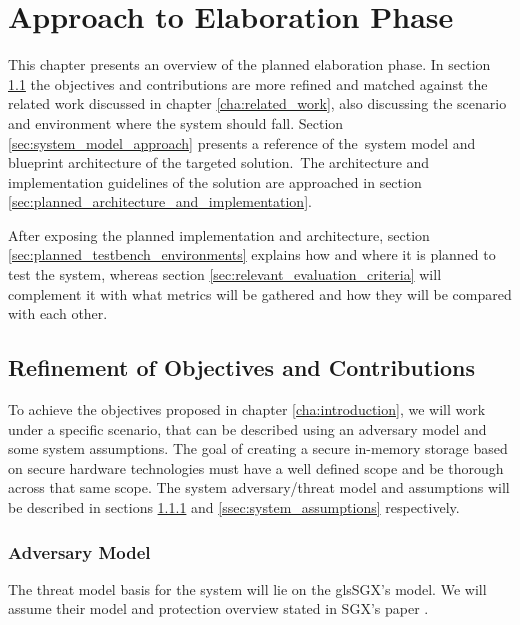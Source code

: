 
\chapter{Approach to Elaboration Phase}
\label{cha:approach_to_elaboration_phase}

This chapter presents an overview of the planned elaboration phase. 
In section \ref{sec:refinement_of_objectives_and_contributions} the objectives and contributions are more refined and matched against the related work discussed in chapter \ref{cha:related_work}, also discussing the scenario and environment where the system should fall.
Section \ref{sec:system_model_approach} presents a reference of the system model and blueprint architecture of the targeted solution. The architecture and implementation guidelines of the solution are approached in section \ref{sec:planned_architecture_and_implementation}.

After exposing the planned implementation and architecture, section \ref{sec:planned_testbench_environments} explains how and where it is planned to test the system, whereas section \ref{sec:relevant_evaluation_criteria} will complement it with what metrics will be gathered and how they will be compared with each other.

\section{Refinement of Objectives and Contributions} %
\label{sec:refinement_of_objectives_and_contributions}

To achieve the objectives proposed in chapter \ref{cha:introduction}, we will work under a specific scenario, that can be described using an adversary model and some system assumptions. The goal of creating a secure in-memory storage based on secure hardware technologies must have a well defined scope and be thorough across that same scope. The system adversary/threat model and assumptions will be described in sections \ref{ssec:adversary_model} and \ref{ssec:system_assumptions} respectively.

\subsection{Adversary Model}
\label{ssec:adversary_model}

The threat model basis for the system will lie on the gls{SGX}'s model. We will assume their model and protection overview stated in \gls{SGX}'s paper \cite{sgx:7}.

